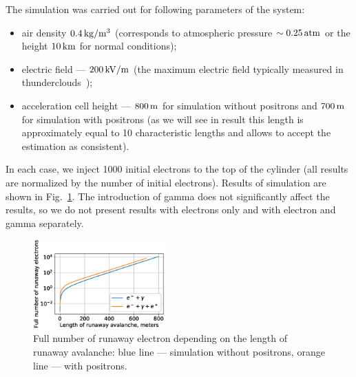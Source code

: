 \documentclass[doublecol,linenumbers]{epl2} %
\begin{document}
The simulation was carried out for following parameters of the system:
\begin{itemize}
    \item air density $0.4\un{kg/m^3}$ (corresponds to atmospheric pressure $\sim 0.25\un{atm}$ or the height $10\un{km}$ for normal conditions);
    \item electric field --- $200\un{kV/m}$ (the maximum electric field typically measured in thunderclouds~\cite{rakov_uman});
    \item acceleration cell height --- $800\un{m}$ for simulation without positrons and $700\un{m}$ for simulation with positrons (as we will see in result this length is approximately equal to 10 characteristic lengths and allows to accept the estimation as consistent).
\end{itemize}

In each case, we inject 1000 initial electrons to the top of the cylinder (all results are normalized by the number of initial electrons). Results of simulation are shown in Fig.~\ref{fig:sim}. The introduction of gamma does not significantly affect the results, so we do not present results with electrons only and with electron and gamma separately.

\begin{figure}[h]
    \centering
    \includegraphics[width=0.45\textwidth]{figures/simulation.eps}
    \caption{Full number of runaway electron depending on the length of runaway avalanche: blue line --- simulation without positrons, orange line --- with positrons.}
    \label{fig:sim}
\end{figure}
\end{document}
